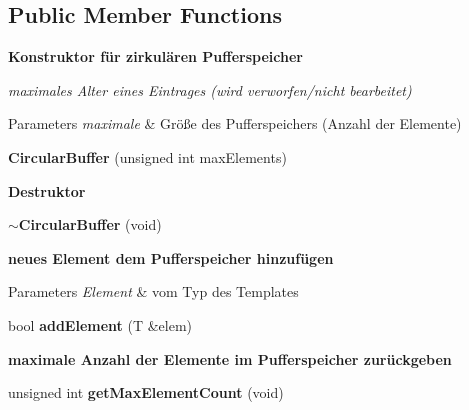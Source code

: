 \subsection*{Public Member Functions}
\begin{Indent}{\bf Konstruktor für zirkulären Pufferspeicher}\par
{\em maximales Alter eines Eintrages (wird verworfen/nicht bearbeitet)


\begin{DoxyParams}{Parameters}
{\em maximale} & Größe des Pufferspeichers (Anzahl der Elemente) \\
\hline
\end{DoxyParams}
}\begin{DoxyCompactItemize}
\item 
\hypertarget{classrc_1_1CircularBuffer_af0abd0737caf863845860418e36cee61}{{\bfseries Circular\+Buffer} (unsigned int max\+Elements)}\label{classrc_1_1CircularBuffer_af0abd0737caf863845860418e36cee61}

\end{DoxyCompactItemize}
\end{Indent}
\begin{Indent}{\bf Destruktor}\par
\begin{DoxyCompactItemize}
\item 
\hypertarget{classrc_1_1CircularBuffer_a5d0be18eb4de56cacfcc716c55e55639}{{\bfseries $\sim$\+Circular\+Buffer} (void)}\label{classrc_1_1CircularBuffer_a5d0be18eb4de56cacfcc716c55e55639}

\end{DoxyCompactItemize}
\end{Indent}
\begin{Indent}{\bf neues Element dem Pufferspeicher hinzufügen}\par
{\em 
\begin{DoxyParams}{Parameters}
{\em Element} & vom Typ des Templates \\
\hline
\end{DoxyParams}
}\begin{DoxyCompactItemize}
\item 
\hypertarget{classrc_1_1CircularBuffer_a9d24da68ea76c76e353bc6eb1061aca4}{bool {\bfseries add\+Element} (T \&elem)}\label{classrc_1_1CircularBuffer_a9d24da68ea76c76e353bc6eb1061aca4}

\end{DoxyCompactItemize}
\end{Indent}
\begin{Indent}{\bf maximale Anzahl der Elemente im Pufferspeicher zurückgeben}\par
\begin{DoxyCompactItemize}
\item 
\hypertarget{classrc_1_1CircularBuffer_ae4194d665b35b6a86444f54c759878b7}{unsigned int {\bfseries get\+Max\+Element\+Count} (void)}\label{classrc_1_1CircularBuffer_ae4194d665b35b6a86444f54c759878b7}

\end{DoxyCompactItemize}
\end{Indent}
